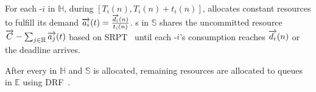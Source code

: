 For each {\burstq}-$i$ in $\mathbb{H}$, during $[T_i(n),T_i(n)+t_i(n)]$, \name allocates constant resources to fulfill its demand $\protect\overrightarrow{a_i}(t)=\frac{\protect\overrightarrow{d_i}(n)}{t_i(n)}$. %
{\burstq}s in $\mathbb{S}$ shares the uncommitted resource $\protect\overrightarrow{C}-\sum_{j\in \mathbb{H}}\protect\overrightarrow{a_j}(t)$ based on SRPT~\cite{bansal2001analysis} until each {\burstq}-$i$'s consumption reaches $\protect\overrightarrow{d_i}(n)$ or the deadline arrives.





After every {\burstq} in $\mathbb{H}$ and $\mathbb{S}$ is allocated, remaining resources are allocated to queues in $\mathbb{E}$ using DRF~\cite{drf}. %

%

